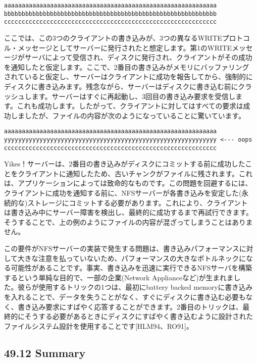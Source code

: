 \begin{verbatim}
aaaaaaaaaaaaaaaaaaaaaaaaaaaaaaaaaaaaaaaaaaaaaaaaaaaaaaaaaaaa
bbbbbbbbbbbbbbbbbbbbbbbbbbbbbbbbbbbbbbbbbbbbbbbbbbbbbbbbbbbb
cccccccccccccccccccccccccccccccccccccccccccccccccccccccccccc
\end{verbatim}

ここでは、この3つのクライアントの書き込みが、3つの異なるWRITEプロトコル・メッセージとしてサーバーに発行されたと想定します。第1のWRITEメッセージがサーバによって受信され、ディスクに発行され、クライアントがその成功を通知したと仮定します。ここで、2番目の書き込みがメモリにバッファリングされていると仮定し、サーバーはクライアントに成功を報告してから、強制的にディスクに書き込みます。残念ながら、サーバーはディスクに書き込む前にクラッシュします。サーバーはすぐに再起動し、3回目の書き込み要求を受信します。これも成功します。したがって、クライアントに対してはすべての要求は成功しましたが、ファイルの内容が次のようになっていることに驚いています。

\begin{verbatim}
aaaaaaaaaaaaaaaaaaaaaaaaaaaaaaaaaaaaaaaaaaaaaaaaaaaaaaaaaaaa
yyyyyyyyyyyyyyyyyyyyyyyyyyyyyyyyyyyyyyyyyyyyyyyyyyyyyyyyyyyy <--- oops
cccccccccccccccccccccccccccccccccccccccccccccccccccccccccccc
\end{verbatim}

Yikes！サーバーは、2番目の書き込みがディスクにコミットする前に成功したことをクライアントに通知したため、古いチャンクがファイルに残されます。これは、アプリケーションによっては致命的なものです。この問題を回避するには、クライアントに成功を通知する前に、NFSサーバーが各書き込みを安定した(永続的な)ストレージにコミットする必要があります。これにより、クライアントは書き込み中にサーバー障害を検出し、最終的に成功するまで再試行できます。そうすることで、上の例のようにファイルの内容が混ざってしまうことはありません。

この要件がNFSサーバーの実装で発生する問題は、書き込みパフォーマンスに対して大きな注意を払っていないため、パフォーマンスの大きなボトルネックになる可能性があることです。事実、書き込みを迅速に実行できるNFSサーバを構築するという単純な目的で、一部の企業(Network
Applianceなど)が生まれました。彼らが使用するトリックの1つは、最初にbattery
backed
memoryに書き込みを入れることで、データを失うことがなく、すぐにディスクに書き込む必要もなく、書き込み要求にすばやく応答することができます。2番目のトリックは、最終的にそうする必要があるときにディスクにすばやく書き込むように設計されたファイルシステム設計を使用することです{[}HLM94、RO91{]}。

\hypertarget{summary-35}{%
\subsection*{49.12 Summary}\label{summary-35}}

